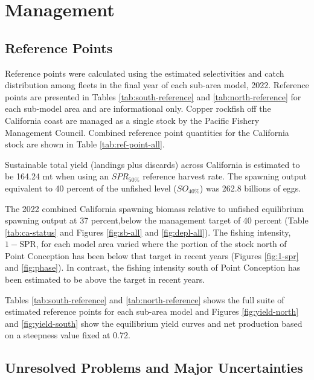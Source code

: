 \documentclass[11pt,
  letterpaper,
]{article}
\begin{document}
\section{Management}\label{management}

\subsection{Reference Points}\label{reference-points-1}

Reference points were calculated using the estimated selectivities and catch distribution among fleets in the final year of each sub-area model, 2022. Reference points are presented in Tables \ref{tab:south-reference} and \ref{tab:north-reference} for each sub-model area and are informational only. Copper rockfish off the California coast are managed as a single stock by the Pacific Fishery Management Council. Combined reference point quantities for the California stock are shown in Table \ref{tab:ref-point-all}.

Sustainable total yield (landings plus discards) across California is estimated to be 164.24 mt when using an \(SPR_{50\%}\) reference harvest rate. The spawning output equivalent to 40 percent of the unfished level (\(SO_{40\%}\)) was 262.8 billions of eggs.

The 2022 combined California spawning biomass relative to unfished equilibrium spawning output at 37 percent,below the management target of 40 percent (Table \ref{tab:ca-status} and Figures \ref{fig:sb-all} and \ref{fig:depl-all}). The fishing intensity, \(1-\text{SPR}\), for each model area varied where the portion of the stock north of Point Conception has been below that target in recent years (Figures \ref{fig:1-spr} and \ref{fig:phase}). In contrast, the fishing intensity south of Point Conception has been estimated to be above the target in recent years.

Tables \ref{tab:south-reference} and \ref{tab:north-reference} shows the full suite of estimated reference points for each sub-area model and Figures \ref{fig:yield-north} and \ref{fig:yield-south} show the equilibrium yield curves and net production based on a steepness value fixed at 0.72.

\subsection{Unresolved Problems and Major Uncertainties}\label{unresolved-problems-and-major-uncertainties-1}
\end{document}
